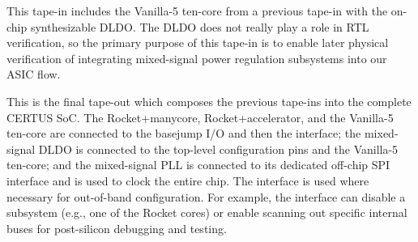 \begin{cbxlist}{1.5em}{0em}{0.5em}
  \item {} This
     tape-in includes the Vanilla-5 ten-core from a previous tape-in with
     the on-chip synthesizable DLDO. The DLDO does not really play a role
     in RTL verification, so the primary purpose of this tape-in is to
     enable later physical verification of integrating mixed-signal power
     regulation subsystems into our ASIC flow.

  \item {} This is the final tape-out which
     composes the previous tape-ins into the complete CERTUS SoC. The
     Rocket+manycore, Rocket+accelerator, and the Vanilla-5 ten-core are
     connected to the basejump I/O and then the  interface;
     the mixed-signal DLDO is connected to the top-level configuration
     pins and the Vanilla-5 ten-core; and the mixed-signal PLL is
     connected to its dedicated off-chip SPI interface and is used to
     clock the entire chip. The  interface is used where
     necessary for out-of-band configuration. For example, the
      interface can disable a subsystem (e.g., one of the
     Rocket cores) or enable scanning out specific internal buses for
     post-silicon debugging and testing.

\end{cbxlist}

